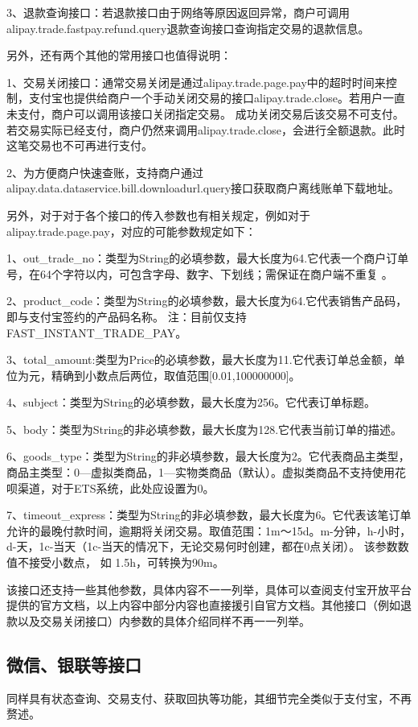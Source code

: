 3、退款查询接口：若退款接口由于网络等原因返回异常，商户可调用alipay.trade.fastpay.refund.query退款查询接口查询指定交易的退款信息。

另外，还有两个其他的常用接口也值得说明：

1、交易关闭接口：通常交易关闭是通过alipay.trade.page.pay中的超时时间来控制，支付宝也提供给商户一个手动关闭交易的接口alipay.trade.close。若用户一直未支付，商户可以调用该接口关闭指定交易。  成功关闭交易后该交易不可支付。若交易实际已经支付，商户仍然来调用alipay.trade.close，会进行全额退款。此时这笔交易也不可再进行支付。

2、为方便商户快速查账，支持商户通过alipay.data.dataservice.bill.downloadurl.query接口获取商户离线账单下载地址。

另外，对于对于各个接口的传入参数也有相关规定，例如对于alipay.trade.page.pay，对应的可能参数规定如下：

1、out_trade_no：类型为String的必填参数，最大长度为64.它代表一个商户订单号，在64个字符以内，可包含字母、数字、下划线；需保证在商户端不重复	。

2、product_code：类型为String的必填参数，最大长度为64.它代表销售产品码，即与支付宝签约的产品码名称。 注：目前仅支持FAST_INSTANT_TRADE_PAY。

3、total_amount:类型为Price的必填参数，最大长度为11.它代表订单总金额，单位为元，精确到小数点后两位，取值范围[0.01,100000000]。

4、subject：类型为String的必填参数，最大长度为256。它代表订单标题。

5、body：类型为String的非必填参数，最大长度为128.它代表当前订单的描述。

6、goods_type：类型为String的非必填参数，最大长度为2。它代表商品主类型，商品主类型：0—虚拟类商品，1—实物类商品（默认）。虚拟类商品不支持使用花呗渠道，对于ETS系统，此处应设置为0。

7、timeout_express：类型为String的非必填参数，最大长度为6。它代表该笔订单允许的最晚付款时间，逾期将关闭交易。取值范围：1m～15d。m-分钟，h-小时，d-天，1c-当天（1c-当天的情况下，无论交易何时创建，都在0点关闭）。 该参数数值不接受小数点， 如 1.5h，可转换为90m。

该接口还支持一些其他参数，具体内容不一一列举，具体可以查阅支付宝开放平台提供的官方文档，以上内容中部分内容也直接援引自官方文档。其他接口（例如退款以及交易关闭接口）内参数的具体介绍同样不再一一列举。

\subsection{微信、银联等接口}
同样具有状态查询、交易支付、获取回执等功能，其细节完全类似于支付宝，不再赘述。


